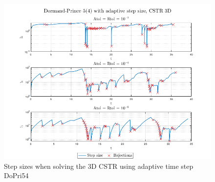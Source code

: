 \begin{figure}[H]
    \centering
    \includegraphics[width=\textwidth]{graphics/opg6/cstr_3d_h.png}
    \caption{Step sizes when solving the 3D CSTR using adaptive time step DoPri54}
    \label{fig6:3d_h}
\end{figure}






